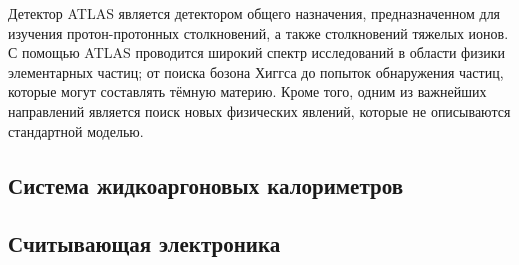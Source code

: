 Детектор ATLAS является детектором общего назначения, предназначенном для изучения протон-протонных столкновений, а также столкновений тяжелых ионов. С помощью ATLAS проводится широкий спектр исследований в области физики элементарных частиц; от поиска бозона Хиггса до попыток обнаружения частиц, которые могут составлять тёмную материю. Кроме того, одним из важнейших направлений является поиск новых физических явлений, которые не описываются стандартной моделью.\par

\subsection{Система жидкоаргоновых калориметров}

\subsection{Считывающая электроника}

